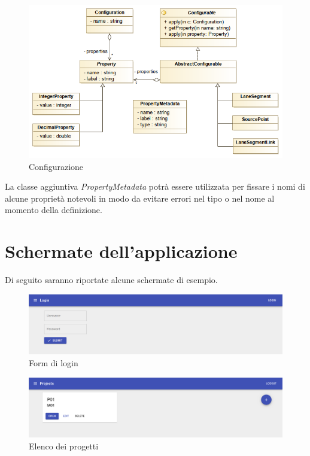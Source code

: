 \begin{figure}[h]
	\centering
	\includegraphics[scale=0.5]{img/model03}
	\caption{Configurazione}
	\label{fig:model03}
\end{figure}

La classe aggiuntiva \textit{PropertyMetadata} potrà essere utilizzata per fissare i nomi di alcune proprietà notevoli in modo da evitare errori nel tipo o nel nome al momento della definizione.



\section{Schermate dell'applicazione}
Di seguito saranno riportate alcune schermate di esempio.

\begin{figure}[h]
	\centering
	\includegraphics[width=\textwidth]{img/screen00}
	\caption{Form di login}
	\label{fig:screen00}
\end{figure}

\begin{figure}[h]
	\centering
	\includegraphics[width=\textwidth]{img/screen01}
	\caption{Elenco dei progetti}
	\label{fig:screen01}
\end{figure}

